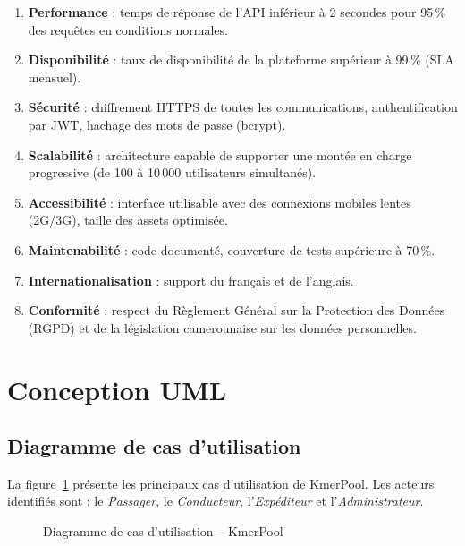 \documentclass[12pt, a4paper]{report}
\begin{document}
\begin{enumerate}
  \item \textbf{Performance} : temps de réponse de l'\ac{API} inférieur à 2 secondes
        pour 95\,\% des requêtes en conditions normales.
  \item \textbf{Disponibilité} : taux de disponibilité de la plateforme supérieur à
        99\,\% (SLA mensuel).
  \item \textbf{Sécurité} : chiffrement \ac{HTTPS} de toutes les communications,
        authentification par \ac{JWT}, hachage des mots de passe (bcrypt).
  \item \textbf{Scalabilité} : architecture capable de supporter une montée en charge
        progressive (de 100 à 10\,000 utilisateurs simultanés).
  \item \textbf{Accessibilité} : interface utilisable avec des connexions mobiles lentes
        (2G/3G), taille des assets optimisée.
  \item \textbf{Maintenabilité} : code documenté, couverture de tests supérieure à 70\,\%.
  \item \textbf{Internationalisation} : support du français et de l'anglais.
  \item \textbf{Conformité} : respect du Règlement Général sur la Protection des Données
        (RGPD) et de la législation camerounaise sur les données personnelles.
\end{enumerate}

\section{Conception UML}

\subsection{Diagramme de cas d'utilisation}

La figure~\ref{fig:usecase} présente les principaux cas d'utilisation de KmerPool.
Les acteurs identifiés sont : le \textit{Passager}, le \textit{Conducteur},
l'\textit{Expéditeur} et l'\textit{Administrateur}.

\begin{figure}[H]
  \centering
  \caption{Diagramme de cas d'utilisation -- KmerPool}
  \label{fig:usecase}
\end{figure}
\end{document}
